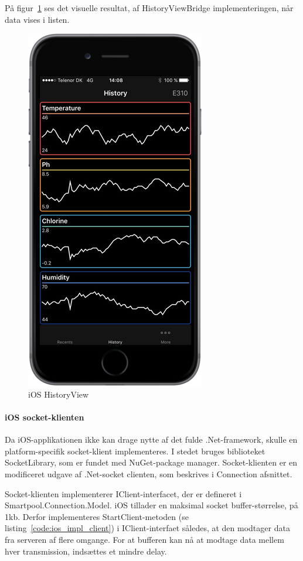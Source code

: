 På figur~\ref{fig:ios_imp_historyview} ses det visuelle resultat, af HistoryViewBridge implementeringen, når data vises i listen.

\begin{figure}
	\centering
	\includegraphics[width=0.4\linewidth]{figs/implementering/ios_imp_historyview}
	\caption{iOS HistoryView}
	\label{fig:ios_imp_historyview}
\end{figure}

\paragraph{iOS socket-klienten}
Da iOS-applikationen ikke kan drage nytte af det fulde .Net-framework, skulle en platform-specifik socket-klient implementeres. I stedet bruges biblioteket SocketLibrary, som er fundet med NuGet-package manager. Socket-klienten er en modificeret udgave af .Net-socket clienten, som beskrives i Connection afsnittet.

Socket-klienten implementerer IClient-interfacet, der er defineret i Smartpool.Connection.Model. iOS tillader en maksimal socket buffer-størrelse, på 1kb. Derfor implementeres StartClient-metoden (se listing~\ref{code:ios_impl_client}) i IClient-interfaet således, at den modtager data fra serveren af flere omgange. For at bufferen kan nå at modtage data mellem hver transmission, indsættes et mindre delay.


